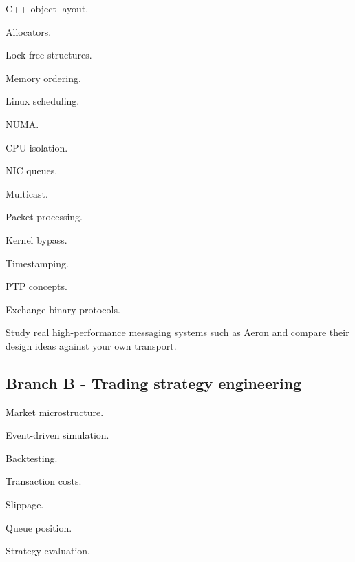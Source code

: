 \documentclass[11pt,letterpaper]{article}
\begin{document}
\begin{topics}

\item C++ object layout.

\item Allocators.

\item Lock-free structures.

\item Memory ordering.

\item Linux scheduling.

\item NUMA.

\item CPU isolation.

\item NIC queues.

\item Multicast.

\item Packet processing.

\item Kernel bypass.

\item Timestamping.

\item PTP concepts.

\item Exchange binary protocols.

\end{topics}

Study real high-performance messaging systems such as Aeron and compare their design ideas against your own transport.

\subsection*{Branch B - Trading strategy engineering}

\begin{topics}

\item Market microstructure.

\item Event-driven simulation.

\item Backtesting.

\item Transaction costs.

\item Slippage.

\item Queue position.

\item Strategy evaluation.

\end{topics}
\end{document}
